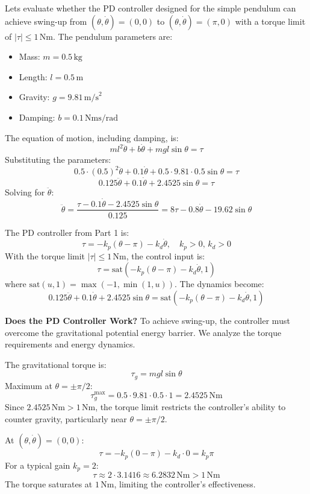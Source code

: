 \documentclass[12pt,a4paper]{article}
\begin{document}
Lets evaluate whether the PD controller designed for the simple pendulum can achieve swing-up from \((\theta, \dot{\theta}) = (0, 0)\) to \((\theta, \dot{\theta}) = (\pi, 0)\) with a torque limit of \(|\tau| \leq 1 \, \text{Nm}\). The pendulum parameters are:
\begin{itemize}
    \item Mass: \(m = 0.5 \, \text{kg}\)
    \item Length: \(l = 0.5 \, \text{m}\)
    \item Gravity: \(g = 9.81 \, \text{m/s}^2\)
    \item Damping: \(b = 0.1 \, \text{Nms/rad}\)
\end{itemize}

The equation of motion, including damping, is:
\[
m l^2 \ddot{\theta} + b \dot{\theta} + m g l \sin \theta = \tau
\]
Substituting the parameters:
\[
0.5 \cdot (0.5)^2 \ddot{\theta} + 0.1 \dot{\theta} + 0.5 \cdot 9.81 \cdot 0.5 \sin \theta = \tau
\]
\[
0.125 \ddot{\theta} + 0.1 \dot{\theta} + 2.4525 \sin \theta = \tau
\]
Solving for \(\ddot{\theta}\):
\begin{equation}
    \ddot{\theta} = \frac{\tau - 0.1 \dot{\theta} - 2.4525 \sin \theta}{0.125} = 8 \tau - 0.8 \dot{\theta} - 19.62 \sin \theta
\end{equation}



The PD controller from Part 1 is:
\[
\tau = -k_p (\theta - \pi) - k_d \dot{\theta}, \quad k_p > 0, \, k_d > 0
\]
With the torque limit \(|\tau| \leq 1 \, \text{Nm}\), the control input is:
\[
\tau = \text{sat} \left( -k_p (\theta - \pi) - k_d \dot{\theta}, 1 \right)
\]
where \(\text{sat}(u, 1) = \max(-1, \min(1, u))\). The dynamics become:
\[
0.125 \ddot{\theta} + 0.1 \dot{\theta} + 2.4525 \sin \theta = \text{sat} \left( -k_p (\theta - \pi) - k_d \dot{\theta}, 1 \right)
\]

\textbf{Does the PD Controller Work?}
To achieve swing-up, the controller must overcome the gravitational potential energy barrier. We analyze the torque requirements and energy dynamics.


The gravitational torque is:
\[
\tau_g = m g l \sin \theta
\]
Maximum at \(\theta = \pm \pi/2\):
\[
\tau_g^{\text{max}} = 0.5 \cdot 9.81 \cdot 0.5 \cdot 1 = 2.4525 \, \text{Nm}
\]
Since \(2.4525 \, \text{Nm} > 1 \, \text{Nm}\), the torque limit restricts the controller’s ability to counter gravity, particularly near \(\theta = \pm \pi/2\).


At \((\theta, \dot{\theta}) = (0, 0)\):
\[
\tau = -k_p (0 - \pi) - k_d \cdot 0 = k_p \pi
\]
For a typical gain \(k_p = 2\):
\[
\tau \approx 2 \cdot 3.1416 \approx 6.2832 \, \text{Nm} > 1 \, \text{Nm}
\]
The torque saturates at \(1 \, \text{Nm}\), limiting the controller’s effectiveness.
\end{document}
